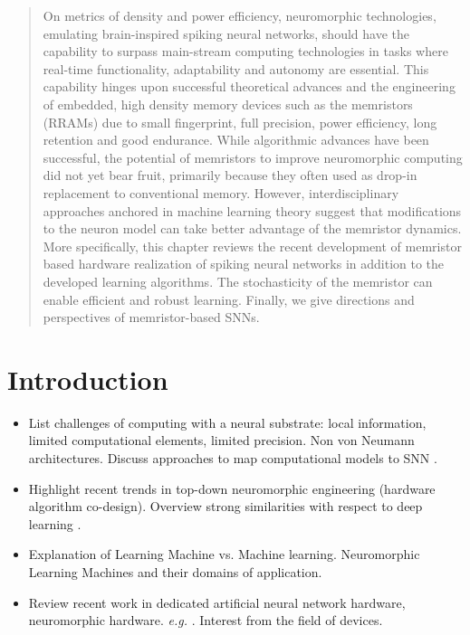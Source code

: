 \documentclass[english]{article}
\renewcommand{\cite}{\citep}
\begin{document}
\begin{abstract}
On metrics of density and power efficiency, neuromorphic technologies, emulating brain-inspired spiking neural networks, should have the capability to surpass main-stream computing technologies in tasks where real-time functionality, adaptability and autonomy are essential. This capability hinges upon successful theoretical advances and the engineering of embedded, high density memory devices such as the memristors (RRAMs) due to small fingerprint, full precision, power efficiency, long retention and good endurance. While algorithmic advances have been successful, the potential of memristors to improve neuromorphic computing did not yet bear fruit, primarily because they often used as drop-in replacement to conventional memory. However, interdisciplinary approaches anchored in machine learning theory suggest that modifications to the neuron model can take better advantage of the memristor dynamics. More specifically, this chapter reviews the recent development of memristor based hardware realization of spiking neural networks in addition to the developed learning algorithms. The stochasticity of the memristor can enable efficient and robust learning. Finally, we give directions and perspectives of memristor-based SNNs.              

\end{abstract}

\section{Introduction}
\begin{itemize}
  \item List challenges of computing with a neural substrate: local information, limited computational elements, limited precision. Non von Neumann architectures. Discuss approaches to map computational models to SNN \cite{Neftci18_datapowe}.  
  \item Highlight recent trends in top-down neuromorphic engineering (hardware algorithm co-design). Overview strong similarities with respect to deep learning \cite{Neftci18_datapowe}. 
  \item Explanation of Learning Machine vs. Machine learning. Neuromorphic Learning Machines and their domains of application. 
  \item Review recent work in dedicated artificial neural network hardware, neuromorphic hardware. \emph{e.g.} \cite{Jouppi_etal17_in-dperf}. Interest from the field of devices.
\end{itemize}
\end{document}

